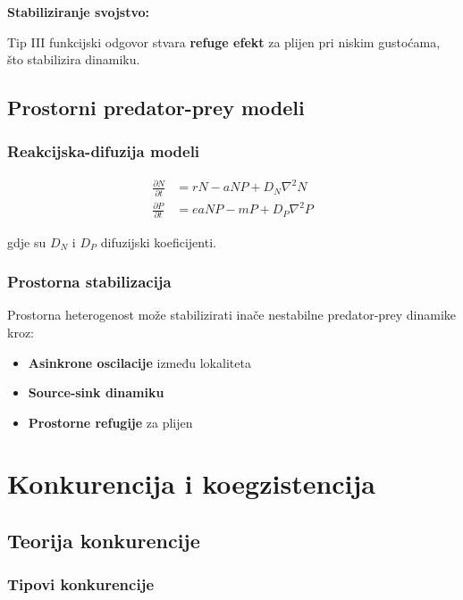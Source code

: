 \documentclass[11pt,oneside]{book}
\begin{document}
\textbf{Stabiliziranje svojstvo:}

Tip III funkcijski odgovor stvara \textbf{refuge efekt} za plijen pri niskim gustoćama, što stabilizira dinamiku.

\subsection{Prostorni predator-prey modeli}

\subsubsection{Reakcijska-difuzija modeli}

\begin{align}
	\frac{\partial N}{\partial t} &= rN - aNP + D_N \nabla^2 N \\
	\frac{\partial P}{\partial t} &= eaNP - mP + D_P \nabla^2 P
\end{align}

gdje su $D_N$ i $D_P$ difuzijski koeficijenti.

\subsubsection{Prostorna stabilizacija}

Prostorna heterogenost može stabilizirati inače nestabilne predator-prey dinamike kroz:

\begin{itemize}
	\item \textbf{Asinkrone oscilacije} između lokaliteta
	\item \textbf{Source-sink dinamiku}
	\item \textbf{Prostorne refugije} za plijen
\end{itemize}

\section{Konkurencija i koegzistencija}

\subsection{Teorija konkurencije}

\subsubsection{Tipovi konkurencije}
\end{document}
